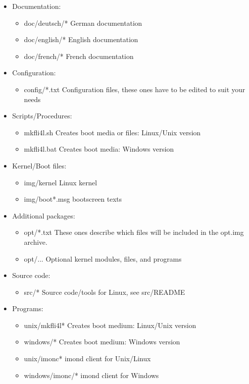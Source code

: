 \begin{itemize}
\item Documentation:
  \begin{itemize}
  \item doc/deutsch/* German documentation
  \item doc/english/* English documentation
  \item doc/french/*  French documentation
  \end{itemize}

\item Configuration:
  \begin{itemize}
  \item config/*.txt Configuration files, these ones have to be edited to suit your needs
  \end{itemize}

\item Scripts/Procedures:
  \begin{itemize}
  \item mkfli4l.sh Creates boot media or files: Linux/Unix version
  \item mkfli4l.bat Creates boot media: Windows version
  \end{itemize}

\item Kernel/Boot files:
  \begin{itemize}
  \item img/kernel Linux kernel
  \item img/boot*.msg bootscreen texts
  \end{itemize}

\item Additional packages:
  \begin{itemize}
  \item opt/*.txt These ones describe which files will be included in the opt.img archive.
  \item opt/... Optional kernel modules, files, and programs
  \end{itemize}

\item Source code:
  \begin{itemize}
  \item src/* Source code/tools for Linux, see src/README
  \end{itemize}

\item Programs:
  \begin{itemize}
  \item unix/mkfli4l* Creates boot medium: Linux/Unix version
  \item windows/* Creates boot medium: Windows version
  \item unix/imonc* imond client for Unix/Linux
  \item windows/imonc/* imond client for Windows
  \end{itemize}
\end{itemize}


